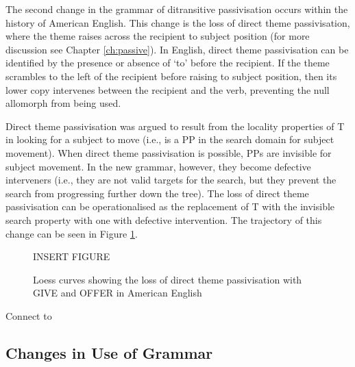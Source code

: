 	The second change in the grammar of ditransitive passivisation occurs within the history of American English. This change is the loss of direct theme passivisation, where the theme raises across the recipient to subject position (for more discussion see Chapter \ref{ch:passive}). In English, direct theme passivisation can be identified by the presence or absence of `to' before the recipient. If the theme scrambles to the left of the recipient before raising to subject position, then its lower copy intervenes between the recipient and the verb, preventing the null allomorph from being used. 
	
	Direct theme passivisation was argued to result from the locality properties of T in looking for a subject to move (i.e., is a PP in the search domain for subject movement). When direct theme passivisation is possible, PPs are invisible for subject movement. In the new grammar, however, they become defective interveners (i.e., they are not valid targets for the search, but they prevent the search from progressing further down the tree). The loss of direct theme passivisation can be operationalised as the replacement of T with the invisible search property with one with defective intervention. The trajectory of this change can be seen in Figure \ref{fig:loss-of-dt-in-amen}.

	\begin{figure}[ht!]
		INSERT FIGURE
		\caption{Loess curves showing the loss of direct theme passivisation with GIVE and OFFER in American English}
		\label{fig:loss-of-dt-in-amen}
	\end{figure}

	Connect to

	\subsection{Changes in Use of Grammar}

